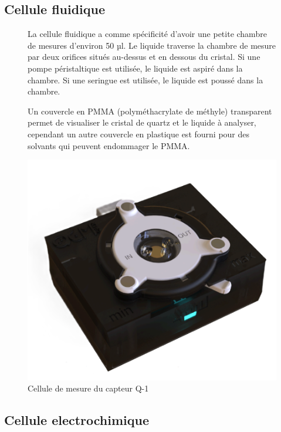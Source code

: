 \subsection{Cellule fluidique}
\begin{figure}[H]
    \centering
    \begin{minipage}{0.48\textwidth}
        \small
        La cellule fluidique a comme spécificité d'avoir une petite chambre de mesures d'environ 50 µl.
        Le liquide traverse la chambre de mesure par deux orifices situés au-dessus et en dessous du cristal.
        Si une pompe péristaltique est utilisée, le liquide est aspiré dans la chambre.
        Si une seringue est utilisée, le liquide est poussé dans la chambre.

        Un couvercle en PMMA (polyméthacrylate de méthyle) transparent permet de visualiser le cristal de quartz et le liquide à analyser,
        cependant un autre couvercle en plastique est fourni pour des solvants qui peuvent endommager le PMMA.
    \end{minipage}\hfill
    \begin{minipage}{0.48\textwidth}
        \centering
        \includegraphics[width=\textwidth]{assets/figures/fluidic cell.png}
        \caption{Cellule de mesure du capteur Q-1 \cite{manual-openqcmQ1}}
        \label{fig:cellule de mesure Q-1}
    \end{minipage}
\end{figure}
\subsection{Cellule electrochimique}

